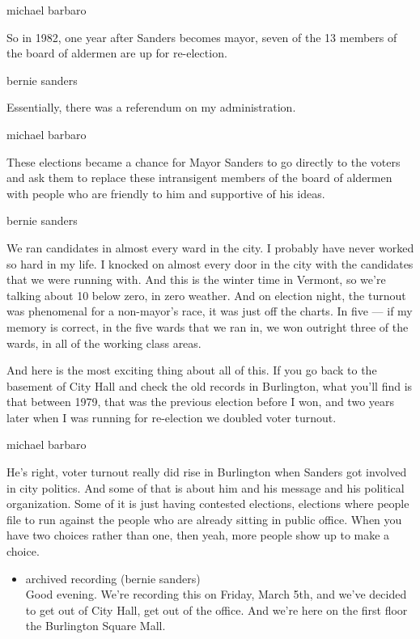 michael barbaro

So in 1982, one year after Sanders becomes mayor, seven of the 13
members of the board of aldermen are up for re-election.

bernie sanders

Essentially, there was a referendum on my administration.

michael barbaro

These elections became a chance for Mayor Sanders to go directly to the
voters and ask them to replace these intransigent members of the board
of aldermen with people who are friendly to him and supportive of his
ideas.

bernie sanders

We ran candidates in almost every ward in the city. I probably have
never worked so hard in my life. I knocked on almost every door in the
city with the candidates that we were running with. And this is the
winter time in Vermont, so we're talking about 10 below zero, in zero
weather. And on election night, the turnout was phenomenal for a
non-mayor's race, it was just off the charts. In five --- if my memory
is correct, in the five wards that we ran in, we won outright three of
the wards, in all of the working class areas.

And here is the most exciting thing about all of this. If you go back to
the basement of City Hall and check the old records in Burlington, what
you'll find is that between 1979, that was the previous election before
I won, and two years later when I was running for re-election we doubled
voter turnout.

michael barbaro

He's right, voter turnout really did rise in Burlington when Sanders got
involved in city politics. And some of that is about him and his message
and his political organization. Some of it is just having contested
elections, elections where people file to run against the people who are
already sitting in public office. When you have two choices rather than
one, then yeah, more people show up to make a choice.

\begin{itemize}
\tightlist
\item
  archived recording (bernie sanders)\\
  Good evening. We're recording this on Friday, March 5th, and we've
  decided to get out of City Hall, get out of the office. And we're here
  on the first floor the Burlington Square Mall.
\end{itemize}

